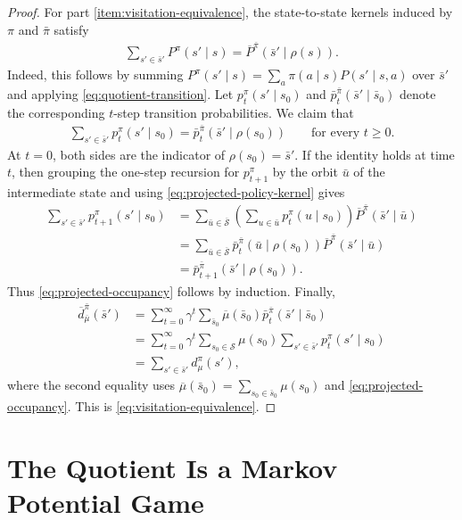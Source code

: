 \documentclass{article}
\theoremstyle{plain}
\theoremstyle{definition}
\theoremstyle{remark}
\newcommand{\St}{\mathcal{S}}
\newcommand{\quotient}[1]{\overline{#1}}
\newcommand{\dbar}{\overline{d}}
\begin{document}
\begin{proof}
For part \ref{item:visitation-equivalence}, the state-to-state kernels induced by
$\pi$ and $\bar\pi$ satisfy
\begin{align}
  \sum_{s'\in\bar s'}P^\pi(s'\mid s)
  =
  \quotient P^{\bar\pi}(\bar s'\mid\rho(s)).
  \label{eq:projected-policy-kernel}
\end{align}
Indeed, this follows by summing
$P^\pi(s'\mid s)=\sum_a\pi(a\mid s)P(s'\mid s,a)$ over $\bar s'$ and applying
\eqref{eq:quotient-transition}. Let
$p_t^\pi(s'\mid s_0)$ and
$\bar p_t^{\bar\pi}(\bar s'\mid\bar s_0)$ denote the corresponding $t$-step
transition probabilities. We claim that
\begin{align}
  \sum_{s'\in\bar s'}p_t^\pi(s'\mid s_0)
  =
  \bar p_t^{\bar\pi}(\bar s'\mid\rho(s_0))
  \qquad
  \text{for every $t\ge0$.}
  \label{eq:projected-occupancy}
\end{align}
At $t=0$, both sides are the indicator of
$\rho(s_0)=\bar s'$. If the identity holds at time $t$, then grouping the
one-step recursion for $p_{t+1}^\pi$ by the orbit $\bar u$ of the intermediate
state and using \eqref{eq:projected-policy-kernel} gives
\begin{align*}
  \sum_{s'\in\bar s'}p_{t+1}^\pi(s'\mid s_0)
  &=
  \sum_{\bar u\in\quotient\St}
  \left(\sum_{u\in\bar u}p_t^\pi(u\mid s_0)\right)
  \quotient P^{\bar\pi}(\bar s'\mid\bar u)\\
  &=
  \sum_{\bar u\in\quotient\St}
  \bar p_t^{\bar\pi}(\bar u\mid\rho(s_0))
  \quotient P^{\bar\pi}(\bar s'\mid\bar u)\\
  &=
  \bar p_{t+1}^{\bar\pi}(\bar s'\mid\rho(s_0)).
\end{align*}
Thus \eqref{eq:projected-occupancy} follows by induction. Finally,
\begin{align*}
  \dbar^{\bar\pi}_{\quotient\mu}(\bar s')
  &=
  \sum_{t=0}^\infty\gamma^t
  \sum_{\bar s_0}
  \quotient\mu(\bar s_0)
  \bar p_t^{\bar\pi}(\bar s'\mid\bar s_0)\\
  &=
  \sum_{t=0}^\infty\gamma^t
  \sum_{s_0\in\St}
  \mu(s_0)
  \sum_{s'\in\bar s'}p_t^\pi(s'\mid s_0)\\
  &=
  \sum_{s'\in\bar s'}d^\pi_\mu(s'),
\end{align*}
where the second equality uses
$\quotient\mu(\bar s_0)=\sum_{s_0\in\bar s_0}\mu(s_0)$ and
\eqref{eq:projected-occupancy}. This is
\eqref{eq:visitation-equivalence}.
\end{proof}

\section{The Quotient Is a Markov Potential Game}
\label{app:proof-quotient-is-mpg}
\end{document}
